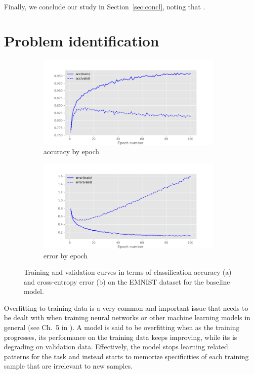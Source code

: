 \documentclass{article}
\begin{document}
Finally, we conclude our study in Section~\ref{sec:concl}, noting that \questionFour.


\section{Problem identification}
\label{sec:task1}

\begin{figure}[t]
    \centering
    \begin{subfigure}{\linewidth}
        \includegraphics[width=\linewidth]{figures/fig1_acc.png}
        \caption{accuracy by epoch}
        \label{fig:example_acccurves}
    \end{subfigure} 
    \begin{subfigure}{\linewidth}
        \centering
        \includegraphics[width=\linewidth]{figures/fig1_err.png}
        \caption{error by epoch}
        \label{fig:example_errorcurves}
    \end{subfigure} 
    \caption{Training and validation curves in terms of classification accuracy (a) and cross-entropy error (b) on the EMNIST dataset for the baseline model.}
    \label{fig:example}
\end{figure} 

Overfitting to training data is a very common and important issue that needs to be dealt with when training neural networks or other machine learning models in general (see Ch.~5 in \citealt{Goodfellow-et-al-2016}).
A model is said to be overfitting when as the training progresses, its performance on the training data keeps improving, while its is degrading on validation data. 
Effectively, the model stops learning related patterns for the task and instead starts to memorize specificities of each training sample that are irrelevant to new samples.
\end{document}
